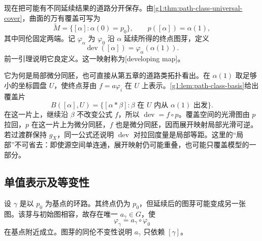 现在把可能有不同延续结果的道路分开保存。由\cref{g1:thm:path-class-universal-cover}，曲面的万有覆盖可写为
\[
	\widetilde M=\{[\alpha]:\alpha(0)=p_0\},\qquad
	p([\alpha])=\alpha(1),
\]
其中同伦固定两端。记 \(\varphi_\alpha\) 为 \(\varphi_0\) 沿 \(\alpha\) 延续所得的终点图芽，定义
\begin{equation}
	\label{g1:eq:developing-definition}
	\operatorname{dev}([\alpha])=\varphi_\alpha(\alpha(1)).
\end{equation}
前一引理说明它良定义。这一映射称为[developing map]。

\ProseParagraphBreak

它为何是局部微分同胚，也可直接从第五章的道路类拓扑看出。在 \(\alpha(1)\) 取足够小的坐标圆盘 \(U\)，使终点芽由 \(f=a\varphi_i\) 在 \(U\) 上表示。\cref{g1:lem:path-class-basis}给出覆盖片
\[
	B([\alpha],U)=\{[\alpha*\beta]:\beta\text{ 在 }U\text{ 内从 }\alpha(1)\text{ 出发}\}.
\]
在这一片上，继续沿 \(\beta\) 不改变公式 \(f\)，所以 \(\operatorname{dev}=f\circ p\)。覆盖空间的光滑图由 \(p\) 拉回，\(p\) 在这一片上为微分同胚，\(f\) 也是微分同胚，因而展开映射局部光滑可逆。若过渡群保持 \(g_X\)，同一公式还说明 \(\operatorname{dev}\) 对拉回度量是局部等距。这里的“局部”不可省去：即使源空间单连通，展开映射仍可能重叠，也可能只覆盖模型的一部分。

\subsection{单值表示及等变性}
\label{g1:subsec:1003:03}

设 \(\gamma\) 是以 \(p_0\) 为基点的环路。其终点仍为 \(p_0\)，但延续后的图芽可能变成另一张图。该芽与初始图相容，故存在唯一 \(a_\gamma\in G\)，使
\[
	\varphi_\gamma=a_\gamma\circ\varphi_0
\]
在基点附近成立。图芽的同伦不变性说明 \(a_\gamma\) 只依赖 \([\gamma]\)。

